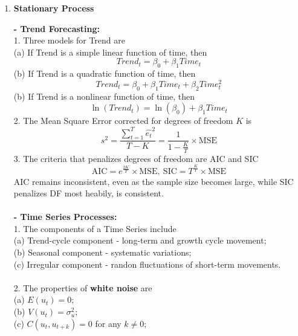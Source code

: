 \documentclass{article}
\begin{document}
\begin{enumerate}[S1 - ]
    \item \textbf{Stationary Process}\\\par
    \textbf{- Trend Forecasting:}\\
    1. Three models for Trend are\\
    (a) If Trend is a simple linear function of time, then
    \begin{equation*}
    Trend_t = \beta_0 + \beta_1 Time_t
    \end{equation*}
    (b) If Trend is a quadratic function of time, then
    \begin{equation*}
    Trend_t = \beta_0 + \beta_1 Time_t + \beta_2 Time_t^2
    \end{equation*}
    (b) If Trend is a nonlinear function of time, then
    \begin{equation*}
    \ln(Trend_t) = \ln(\beta_0) + \beta_1 Time_t
    \end{equation*}
    2. The Mean Square Error corrected for degrees of freedom $K$ is
    \begin{equation*}
    s^2 = \frac{\sum_{t=1}^{T} \hat{e_t}^2}{T-K} = \frac{1}{1-\frac{K}{T}}\times \text{MSE}
    \end{equation*}
    3. The criteria that penalizes degrees of freedom are AIC and SIC
    \begin{equation*}
    \text{AIC} = e^{\frac{2K}{T}} \times \text{MSE}, \ \text{SIC} = T^{\frac{K}{T}} \times \text{MSE}
    \end{equation*}
    AIC remains inconsistent, even as the sample size becomes large, while SIC penalizes DF most heabily, is consistent.\\
    \\
    \textbf{- Time Series Processes:}\\
    1. The components of a Time Series include\\
    (a) Trend-cycle component - long-term and growth cycle movement;\\
    (b) Seasonal component - systematic variations;\\
    (c) Irregular component - randon fluctuations of short-term movements.\\
    \\
    2. The properties of \textbf{white noise} are\\
    (a) $E(u_t) = 0$;\\
    (b) $V(u_t) = \sigma_u^2$;\\
    (c) $C(u_t,u_{t+k}) = 0$ for any $k \neq 0$;\\

\end{enumerate}
\end{document}
